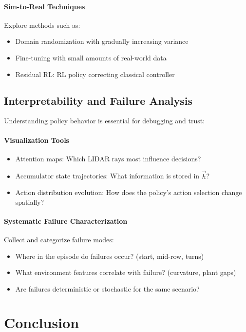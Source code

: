 \documentclass[11pt,a4paper,twocolumn]{article}
\begin{document}
\paragraph{Sim-to-Real Techniques}
Explore methods such as:
\begin{itemize}
    \item Domain randomization with gradually increasing variance
    \item Fine-tuning with small amounts of real-world data
    \item Residual RL: RL policy correcting classical controller
\end{itemize}

\subsection{Interpretability and Failure Analysis}

Understanding policy behavior is essential for debugging and trust:

\paragraph{Visualization Tools}
\begin{itemize}
    \item Attention maps: Which LIDAR rays most influence decisions?
    \item Accumulator state trajectories: What information is stored in $\vec{h}$?
    \item Action distribution evolution: How does the policy's action selection change spatially?
\end{itemize}

\paragraph{Systematic Failure Characterization}
Collect and categorize failure modes:
\begin{itemize}
    \item Where in the episode do failures occur? (start, mid-row, turns)
    \item What environment features correlate with failure? (curvature, plant gaps)
    \item Are failures deterministic or stochastic for the same scenario?
\end{itemize}


\section{Conclusion}
\end{document}
